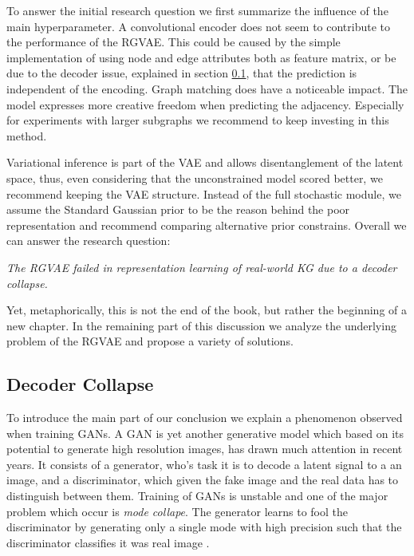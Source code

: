To answer the initial research question we first summarize the influence of the main hyperparameter.
A convolutional encoder does not seem to contribute to the performance of the RGVAE. This could be caused by the simple implementation of using node and edge attributes both as feature matrix, or be due to the decoder issue, explained in section \ref{ssec7:collapse}, that the prediction is independent of the encoding. 
Graph matching does have a noticeable impact. The model expresses more creative freedom when predicting the adjacency. Especially for experiments with larger subgraphs we recommend to keep investing in this method.

Variational inference is part of the VAE and allows disentanglement of the latent space, thus, even considering that the unconstrained model scored better, we recommend keeping the VAE structure. Instead of the full stochastic module, we assume the Standard Gaussian prior to be the reason behind the poor representation and recommend comparing alternative prior constrains.
Overall we can answer the research question:

\begin{center}
    \textit{The RGVAE failed in representation learning of real-world KG due to a decoder collapse.}
\end{center}

Yet, metaphorically, this is not the end of the book, but rather the beginning of a new chapter. In the remaining part of this discussion we analyze the underlying problem of the RGVAE and propose a variety of solutions.


\subsection{Decoder Collapse}
\label{ssec7:collapse}

To introduce the main part of our conclusion we explain a phenomenon observed when training GANs. A GAN is yet another generative model which based on its potential to generate high resolution images, has drawn much attention in recent years. It consists of a generator, who's task it is to decode a latent signal to a an image, and a discriminator, which given the fake image and the real data has to distinguish between them. Training of GANs is unstable and one of the major problem which occur is \textit{mode collape}. The generator learns to fool the discriminator by generating only a single mode with high precision such that the discriminator classifies it was real image \cite{goodfellow2014generative}.

